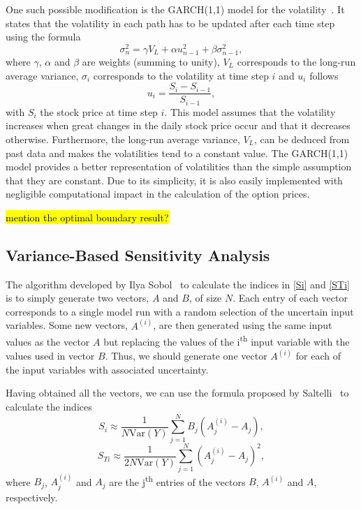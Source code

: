 \documentclass[a4paper,twocolumn,aps,prd,longbibliography,superscriptaddress]{revtex4-1}
\begin{document}
One such possible modification is the GARCH(1,1) model for the volatility~\citep{Wei}.
It states that the volatility in each path has to be updated after each time step using the formula
\begin{equation}
\sigma_n^2=\gamma V_L+\alpha u_{n-1}^2+\beta\sigma_{n-1}^2,
\end{equation}
\noindent where $\gamma$, $\alpha$ and $\beta$ are weights (summing to unity), $V_L$ corresponds to the long-run average variance, $\sigma_i$ corresponds to the volatility at time step $i$ and $u_i$ follows
\begin{equation}
u_i=\frac{S_i-S_{i-1}}{S_{i-1}},
\end{equation}
\noindent with $S_i$ the stock price at time step $i$.
This model assumes that the volatility increases when great changes in the daily stock price occur and that it decreases otherwise. Furthermore, the long-run average variance, $V_L$, can be deduced from past data and makes the volatilities tend to a constant value.
The GARCH(1,1) model provides a better representation of volatilities than the simple assumption that they are constant. Due to its simplicity, it is also easily implemented with negligible computational impact in the calculation of the option prices.

\hl{mention the optimal boundary result?}

\subsection{Variance-Based Sensitivity Analysis}
The algorithm developed by Ilya Sobol~\cite{Sobol} to calculate the indices in \ref{Si} and \ref{STi} is to simply generate two vectors, $A$ and $B$, of size $N$. Each entry of each vector corresponds to a single model run with a random selection of the uncertain input variables.
Some new vectors, $A^{(i)}$, are then generated using the same input values as the vector $A$ but replacing the values of the i\textsuperscript{th} input variable with the values used in vector $B$. Thus, we should generate one vector $A^{(i)}$ for each of the input variables with associated uncertainty.

Having obtained all the vectors, we can use the formula proposed by Saltelli~\citep{Saltelli} to calculate the indices
\begin{equation}\label{Si2}
S_i\approx\frac{1}{N\mathrm{Var}(Y)}\sum_{j=1}^NB_j\left(A^{(i)}_j-A_j\right),
\end{equation}
\begin{equation}\label{STi2}
S_{Ti}\approx\frac{1}{2N\mathrm{Var}(Y)}\sum_{j=1}^N\left(A^{(i)}_j-A_j\right)^2,
\end{equation}
\noindent where $B_j$, $A^{(i)}_j$ and $A_j$ are the j\textsuperscript{th} entries of the vectors $B$, $A^{(i)}$ and $A$, respectively.
\end{document}
